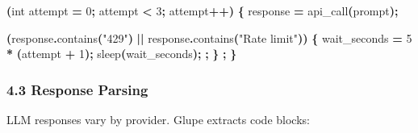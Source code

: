 \documentclass[11pt, a4paper]{article}
\newenvironment{Shaded}{\begin{snugshade}}{\end{snugshade}}
\newcommand{\DataTypeTok}[1]{\textcolor[rgb]{0.13,0.29,0.53}{#1}}
\newcommand{\DecValTok}[1]{\textcolor[rgb]{0.00,0.00,0.81}{#1}}
\newcommand{\NormalTok}[1]{#1}
\newcommand{\OperatorTok}[1]{\textcolor[rgb]{0.81,0.36,0.00}{\textbf{#1}}}
\newcommand{\StringTok}[1]{\textcolor[rgb]{0.31,0.60,0.02}{#1}}
\begin{document}
\begin{Shaded}
\begin{Highlighting}[]
 \OperatorTok{(}\DataTypeTok{int}\NormalTok{ attempt }\OperatorTok{=} \DecValTok{0}\OperatorTok{;}\NormalTok{ attempt }\OperatorTok{\textless{}} \DecValTok{3}\OperatorTok{;}\NormalTok{ attempt}\OperatorTok{++)} \OperatorTok{\{}
\NormalTok{    response }\OperatorTok{=}\NormalTok{ api\_call}\OperatorTok{(}\NormalTok{prompt}\OperatorTok{);}
    
     \OperatorTok{(}\NormalTok{response}\OperatorTok{.}\NormalTok{contains}\OperatorTok{(}\StringTok{"429"}\OperatorTok{)} \OperatorTok{||}\NormalTok{ response}\OperatorTok{.}\NormalTok{contains}\OperatorTok{(}\StringTok{"Rate limit"}\OperatorTok{))} \OperatorTok{\{}
\NormalTok{        wait\_seconds }\OperatorTok{=} \DecValTok{5} \OperatorTok{*} \OperatorTok{(}\NormalTok{attempt }\OperatorTok{+} \DecValTok{1}\OperatorTok{);}
\NormalTok{        sleep}\OperatorTok{(}\NormalTok{wait\_seconds}\OperatorTok{);}
        \OperatorTok{;}
    \OperatorTok{\}}
    \OperatorTok{;}
\OperatorTok{\}}
\end{Highlighting}
\end{Shaded}

\subsubsection{4.3 Response Parsing}\label{response-parsing}

LLM responses vary by provider. Glupe extracts code blocks:
\end{document}
